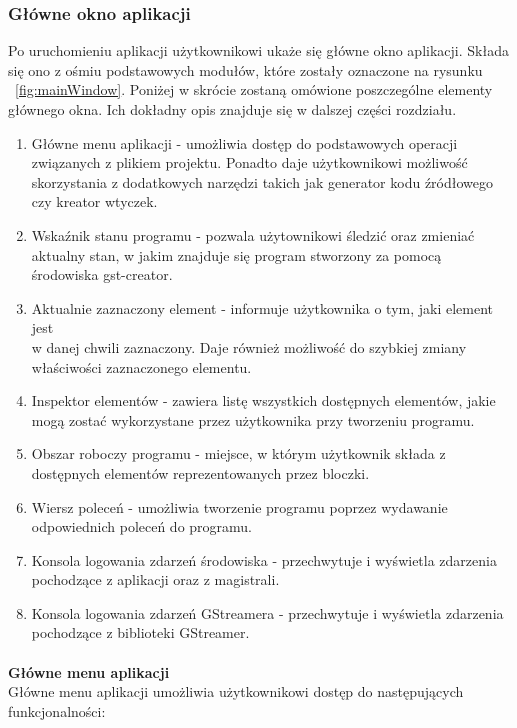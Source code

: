 \documentclass[12pt]{article}
\begin{document}
\subsubsection{Główne okno aplikacji}
Po uruchomieniu aplikacji użytkownikowi ukaże się główne okno aplikacji. Składa się ono z ośmiu podstawowych modułów, które zostały oznaczone na rysunku ~\ref{fig:mainWindow}. Poniżej w skrócie zostaną omówione poszczególne elementy głównego okna. Ich dokładny opis znajduje się w dalszej części rozdziału.
\begin{enumerate}
  \setlength{\itemsep}{0em}
\item Główne menu aplikacji - umożliwia dostęp do podstawowych operacji związanych z plikiem projektu. Ponadto daje użytkownikowi możliwość skorzystania z dodatkowych narzędzi takich jak generator kodu źródłowego czy kreator wtyczek.
\item Wskaźnik stanu programu - pozwala użytownikowi śledzić oraz zmieniać aktualny stan, w jakim znajduje się program stworzony za pomocą środowiska gst-creator.
\item Aktualnie zaznaczony element - informuje użytkownika o tym, jaki element jest \\w danej chwili zaznaczony. Daje również możliwość do szybkiej zmiany właściwości zaznaczonego elementu.
\item Inspektor elementów - zawiera listę wszystkich dostępnych elementów, jakie mogą zostać wykorzystane przez użytkownika przy tworzeniu programu.
\item Obszar roboczy programu - miejsce, w którym użytkownik składa z dostępnych elementów reprezentowanych przez bloczki.
\item Wiersz poleceń - umożliwia tworzenie programu poprzez wydawanie odpowiednich poleceń do programu.
\item Konsola logowania zdarzeń środowiska - przechwytuje i wyświetla zdarzenia pochodzące z aplikacji oraz z magistrali.
\item Konsola logowania zdarzeń GStreamera - przechwytuje i wyświetla zdarzenia pochodzące z biblioteki GStreamer.
\end{enumerate}\paragraph{}\vspace{-3mm}
\textbf{Główne menu aplikacji} \\
Główne menu aplikacji umożliwia użytkownikowi dostęp do następujących funkcjonalności:
\end{document}
